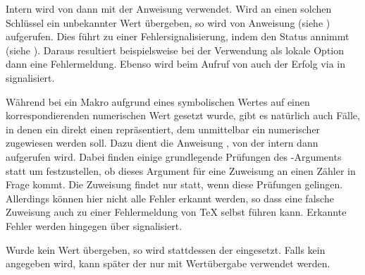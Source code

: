 Intern wird von  dann
 mit der Anweisung
 verwendet. Wird an einen solchen Schlüssel ein
unbekannter Wert übergeben, so wird von  Anweisung
 (siehe
) aufgerufen. Dies führt zu
einer Fehlersignalisierung, indem  den
Status  annimmt (siehe
). Daraus resultiert
beispielsweise bei der Verwendung als lokale Option dann eine
Fehlermeldung. Ebenso wird beim Aufruf von  auch der
Erfolg via  in
 signalisiert.%
%
\EndIndexGroup


\begin{Declaration}
\end{Declaration}
Während bei
 ein Makro aufgrund eines
symbolischen Wertes auf einen korrespondierenden numerischen Wert
gesetzt wurde, gibt es natürlich auch Fälle, in denen ein 
direkt einen  repräsentiert, dem unmittelbar ein
numerischer  zugewiesen werden soll. Dazu dient die Anweisung
, von der intern dann 
aufgerufen wird. Dabei finden einige grundlegende Prüfungen des
-Arguments statt um festzustellen, ob dieses Argument für eine
Zuweisung an einen Zähler in Frage kommt. Die Zuweisung findet nur statt, wenn
diese Prüfungen gelingen. Allerdings können hier nicht alle Fehler erkannt
werden, so dass eine falsche Zuweisung auch zu einer Fehlermeldung von \TeX{}
selbst führen kann. Erkannte Fehler werden hingegen über
 signalisiert.

Wurde kein Wert übergeben, so wird
stattdessen der  eingesetzt. Falls kein 
angegeben wird, kann später der  nur mit Wertübergabe
verwendet werden.%
%
\EndIndexGroup


